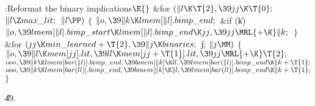 \B{}:Reformat the binary implications\X${}\E{}$\6
\&{for} ${}(\|l\K\T{2},\39\\{jj}\K\T{0};{}$ ${}\|l\Z\\{max\_lit};{}$ ${}\|l%
\PP){}$\5
${}\{{}$\1\6
${}\|o,\39\|k\K\\{lmem}[\|l].\\{bimp\_end};{}$\6
\&{if} (\|k)\1\5
${}\|o,\39\\{lmem}[\|l].\\{bimp\_start}\K\\{lmem}[\|l].\\{bimp\_end}\K\\{jj},%
\39\\{jj}\MRL{+{\K}}\|k;{}$\2\6
\4${}\}{}$\2\6
\&{for} ${}(\\{jj}\K\\{min\_learned}+\T{2},\39\|j\K\\{binaries};{}$ \|j; ${}\|j%
\MM){}$\5
${}\{{}$\1\6
${}\|o,\39\|l\K\\{mem}[\\{jj}].\\{lit},\39\\{ll}\K\\{mem}[\\{jj}+\T{1}].%
\\{lit},\39\\{jj}\MRL{+{\K}}\T{2};{}$\6
${}\\{ooo},\39\|k\K\\{lmem}[\\{bar}(\|l)].\\{bimp\_end},\39\\{bmem}[\|k]\K%
\\{ll},\39\\{lmem}[\\{bar}(\|l)].\\{bimp\_end}\K\|k+\T{1};{}$\6
${}\\{ooo},\39\|k\K\\{lmem}[\\{bar}(\\{ll})].\\{bimp\_end},\39\\{bmem}[\|k]\K%
\|l,\39\\{lmem}[\\{bar}(\\{ll})].\\{bimp\_end}\K\|k+\T{1};{}$\6
\4${}\}{}$\2\par
\U49.\fi

